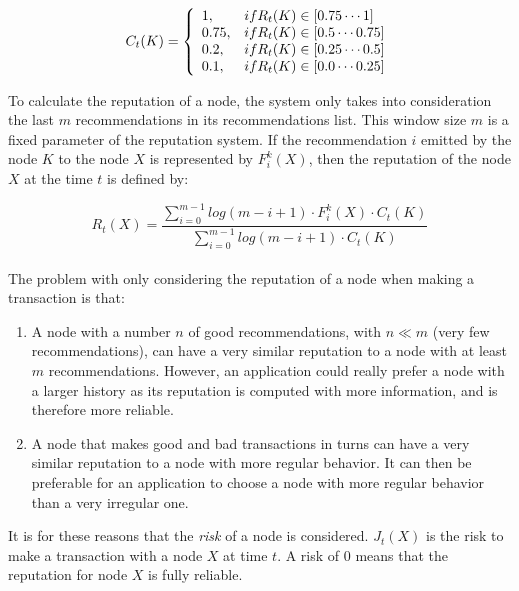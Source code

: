 \begin{equation}
  C_t (K) = \left\{
  \begin{array}{l l}
    1, & if R_t(K) \in [0.75 \cdots 1]\\
    0.75, & if R_t(K) \in [0.5 \cdots 0.75]\\
    0.2,  & if R_t(K) \in [0.25 \cdots 0.5]\\
    0.1, & if R_t(K) \in [0.0 \cdots 0.25]\\
  \end{array}\right.
\end{equation}

To calculate the reputation of a node, the system only takes into consideration
the last $m$ recommendations in its recommendations list. This window size $m$ is
a fixed parameter of the reputation system. If the recommendation  $i$ emitted
by the node $K$ to the node $X$ is represented by $F_i^k (X)$, then the
reputation of the node $X$ at the time $t$ is defined by:

\begin{equation}
  R_t(X) = \frac{\sum_{i=0}^{m-1}  log(m-i+1) \cdot F_i^k(X) \cdot C_t(K)}{
\sum_{i=0}^{m-1} log(m-i+1) \cdot C_t(K)}
\end{equation}\\


The problem with only considering the reputation of a node when making a
transaction is that:
\begin{enumerate}
  \item A node with a number $n$ of good recommendations, with $n \ll m$ (very
few recommendations), can have a very similar reputation to a node with at
least $m$ recommendations. However, an application could really prefer a node
with a larger history as its reputation is computed with more information, and
is therefore more reliable.
  \item A node that makes good and bad transactions in turns can have a very
similar reputation to a node with more regular behavior. It can then be
preferable for an application to choose a node with more regular
behavior than a very irregular one.

\end{enumerate}

It is for these reasons that the \textit{risk} of a node is considered. $J_t(X)$ is
the risk to make a transaction with a node $X$ at time $t$. A risk of 0
means that the reputation for node $X$ is fully reliable.

